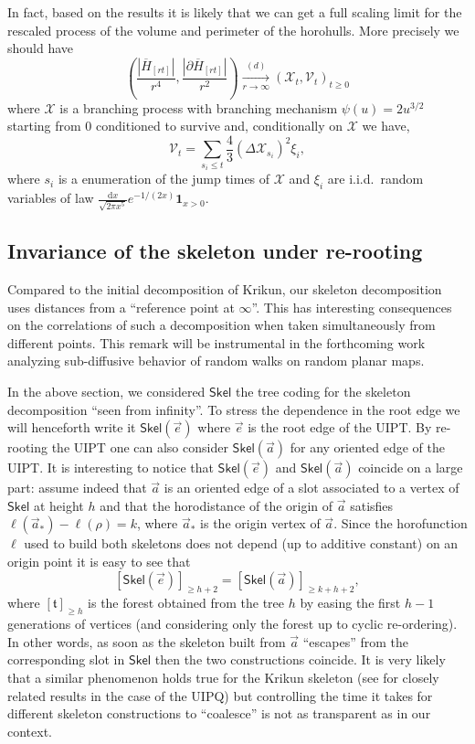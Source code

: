 \documentclass[AHL,XML,longabstracts,Unicode,NoSaveZebib]{cedram}
\begin{document}
\begin{remark} \label{rem:fullscaling} In fact, based on the results \cite{CLG16,Kr,M} it is likely that we can get a full scaling limit for the rescaled process of the volume and perimeter of the horohulls. More precisely we should have
$$ \left( \frac{| \overline{H}_{[rt]}|}{ r^{4}}, \frac{|\partial \overline{H}_{[rt]}|}{ r^{2}} \right) \xrightarrow[r\to\infty]{(d)} ( \mathcal{X}_{t}, \mathcal{V}_{t})_{t \geq 0}$$ where $ \mathcal{X}$ is a branching process with branching mechanism $\psi(u) = 2 u^{3/2}$  starting from $0$ conditioned to survive and, conditionally on $ \mathcal{X}$ we have,
$$ \mathcal{V}_{t} = \sum_{s_{i} \leq t}  \frac{4}{3}\left(\Delta \mathcal{X}_{s_{i}}\right)^2 \xi_{i},$$ where $s_{i}$ is a enumeration of the jump times of $ \mathcal{X}$ and $\xi_{i}$ are i.i.d.~random variables of law $ \frac{ \mathrm{d}x}{ \sqrt{2\pi x^{5}}}e^{-1/(2x)} \mathbf{1}_{x>0}$.
\end{remark}

\subsection{Invariance of the skeleton under re-rooting}
Compared to the initial decomposition of Krikun, our skeleton decomposition uses distances from a ``reference point at $\infty$''. This has interesting consequences on the correlations of such a decomposition when taken simultaneously from different points. This remark will be instrumental in the forthcoming work \cite{CMrandomwalks} analyzing sub-diffusive behavior of random walks on random planar maps.

In the above section, we considered $ \mathsf{Skel}$ the tree coding for the skeleton decomposition ``seen from infinity''. To stress the dependence in the root edge we will henceforth write it $ \mathsf{Skel}( \vec{e})$ where $\vec{e}$ is the root edge of the UIPT. By re-rooting the UIPT one can also consider $ \mathsf{Skel}( \vec{a})$ for any oriented edge of the UIPT. It is interesting to notice that $ \mathsf{Skel}( \vec{e})$ and $ \mathsf{Skel}( \vec{a})$ coincide on a large part:  assume indeed that $ \vec{a}$ is an oriented edge of a slot associated to a vertex of $ \mathsf{Skel}$ at height $h$ and that the horodistance of the origin of $\vec{a}$ satisfies $\ell( \vec{a}_{*})- \ell( \rho)= k$, where $\vec{a}_{*}$ is the origin vertex of $\vec{a}$. Since the horofunction $\ell$ used to build both skeletons does not depend (up to additive constant) on an origin point it is easy to see that
$$ [ \mathsf{Skel}( \vec{e})]_{\geq h+2} = [ \mathsf{Skel}( \vec{a})]_{\geq k+h+2},$$
where $[ \mathfrak{t}]_{ \geq h}$ is the forest obtained from the tree $h$ by easing the first $h-1$ generations of vertices (and considering only the forest up to cyclic re-ordering). In other words, as soon as the skeleton built from $\vec{a}$ ``escapes'' from the corresponding slot in $ \mathsf{Skel}$ then the two constructions coincide. It is very likely that a similar phenomenon holds true for the Krikun skeleton (see \cite{Kr,CMM10} for closely related results in the case of the UIPQ) but controlling the time it takes for different skeleton constructions to ``coalesce'' is not as transparent as in our context.



\end{document}
